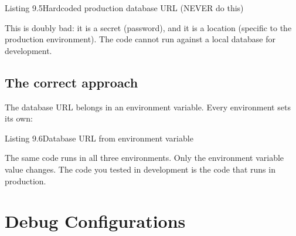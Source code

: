 \begin{codeboxcap}[short]{\textcolor{accent}{Listing 9.5}\enspace Hardcoded production database URL (NEVER do this)}

\begin{Shaded}
\begin{Highlighting}[]
\OperatorTok{=} 
\end{Highlighting}
\end{Shaded}

\end{codeboxcap}

\noindent{}This is doubly bad: it is a secret (password), and it is a location (specific to the production environment). The code cannot run against a local database for development.

\subsection*{The correct approach}\label{09-configuration-coupling:the-correct-approach-1}

The database URL belongs in an environment variable. Every environment sets its own:

\begin{codeboxcap}[short]{\textcolor{accent}{Listing 9.6}\enspace Database URL from environment variable}

\begin{Shaded}
\begin{Highlighting}[]

\OperatorTok{=}\NormalTok{ os.environ[}\NormalTok{]}
\end{Highlighting}
\end{Shaded}

\end{codeboxcap}

\noindent{}The same code runs in all three environments. Only the environment variable value changes. The code you tested in development is the code that runs in production.

\setcounter{section}{2}
\section{Debug Configurations}\label{09-configuration-coupling:93-debug-configurations}

